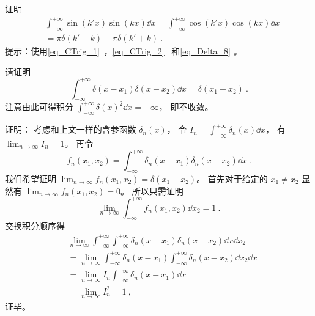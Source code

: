 \begin{exercise}{}\label{exe_Delta_3}
证明
\begin{equation}\label{eq_Delta_9}
\begin{aligned}%
&\int_{-\infty}^{+\infty} \sin(k'x) \sin(kx) \dd{x} = \int_{-\infty}^{+\infty} \cos(k'x) \cos(kx) \dd{x}\\
&= \pi\delta(k' - k) - \pi\delta(k' + k)~.
\end{aligned}
\end{equation}
提示：使用\autoref{eq_CTrig_1}~，\autoref{eq_CTrig_2}~ 和\autoref{eq_Delta_8} 。
\end{exercise}

\begin{example}{}
请证明
\begin{equation}\label{eq_Delta_13}
\int_{-\infty}^{+\infty} \delta(x-x_1) \delta(x-x_2) \dd{x} = \delta(x_1 - x_2)~.
\end{equation}
注意由此可得积分 $\int_{-\infty}^{+\infty}\delta(x)^2 \dd{x} = +\infty$， 即不收敛。

证明： 考虑和上文一样的含参函数 $\delta_n(x)$， 令 $I_n = \int_{-\infty}^{+\infty} \delta_n(x) \dd{x}$， 有 $\lim_{n\to\infty} I_n = 1$。 再令
\begin{equation}
f_n(x_1, x_2) = \int_{-\infty}^{+\infty} \delta_n(x-x_1) \delta_n(x-x_2) \dd{x}~.
\end{equation}
我们希望证明 $\lim_{n\to\infty }f_n(x_1, x_2) = \delta(x_1 - x_2)$。 首先对于给定的 $x_1 \ne x_2$ 显然有 $\lim_{n\to\infty }f_n(x_1, x_2) = 0$。 所以只需证明
\begin{equation}
\lim_{n\to\infty }\int_{-\infty}^{+\infty} f_n(x_1, x_2) \dd{x_2} = 1~.
\end{equation}
交换积分顺序得
\begin{equation}
\begin{aligned}
&\lim_{n\to\infty }\int_{-\infty}^{+\infty}\int_{-\infty}^{+\infty} \delta_n(x-x_1) \delta_n(x-x_2) \dd{x}\dd{x_2}\\
&= \lim_{n\to\infty }\int_{-\infty}^{+\infty} \delta_n(x-x_1) \int_{-\infty}^{+\infty} \delta_n(x-x_2)\dd{x_2} \dd{x}\\
&= \lim_{n\to\infty } I_n \int_{-\infty}^{+\infty} \delta_n(x-x_1)\dd{x}\\
&= \lim_{n\to\infty } I_n^2 = 1~,
\end{aligned}
\end{equation}
证毕。
\end{example}
